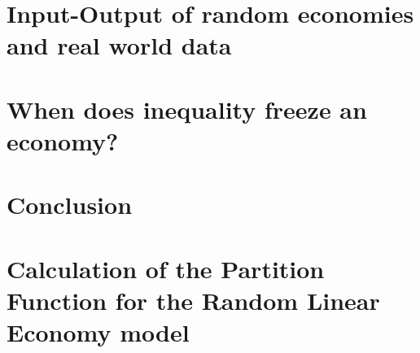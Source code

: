 \documentclass[
  twoside,
  11pt, a4paper,
  footinclude=true,
  headinclude=true,
  cleardoublepage=empty
]{scrbook}
\begin{document}
\chapter{Input-Output of random economies and real world data}

\chapter{When does inequality freeze an economy?}

\chapter{Conclusion}

\appendix

\chapter{Calculation of the Partition Function for the Random Linear
  Economy model} \label{sec:app_replica}

%

{}

    
\end{document}
